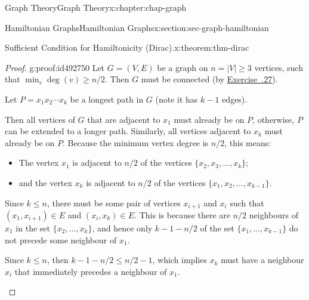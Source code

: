 \documentclass[oneside,10pt,]{book}
\newcommand{\xreffont}{\relax}
\numberwithin{equation}{section}
\begin{document}
\begin{chapterptx}{Graph Theory}{}{Graph Theory}{}{}{x:chapter:chap-graph}
\begin{sectionptx}{Hamiltonian Graphs}{}{Hamiltonian Graphs}{}{}{x:section:sec-graph-hamiltonian}
\begin{theorem}{Sufficient Condition for Hamiltonicity (Dirac).}{}{x:theorem:thm-dirac}
\end{theorem}
\begin{proof}{}{g:proof:id492750}
Let \(G = (V,E)\) be a graph on \(n = |V| \geq 3\) vertices, such that \(\min_v \deg(v) \geq n/2\). Then \(G\) must be connected (by \hyperlink{x:exercise:ex-deg-connected}{Exercise~{\xreffont 5.8.27}}).%
\par
Let \(P = x_1x_2\cdots x_k\) be a longest path in \(G\) (note it has \(k-1\) edges).%
\par
Then all vertices of \(G\) that are adjacent to \(x_1\) must already be on \(P\), otherwise, \(P\) can be extended to a longer path. Similarly, all vertices adjacent to \(x_k\) must already be on \(P\). Because the minimum vertex degree is \(n/2\), this means:%
\begin{itemize}[label=\textbullet]
\item{}The vertex \(x_1\) is adjacent to \(n/2\) of the vertices \(\{x_2,x_3,\ldots,x_k\}\);%
\item{}and the vertex \(x_k\) is adjacent to \(n/2\) of the vertices \(\{x_1,x_2,\ldots,x_{k-1}\}\).%
\end{itemize}
%
\par
Since \(k \leq n\), there must be some pair of vertices \(x_{i+1}\) and \(x_i\) such that \((x_1,x_{i+1}) \in E\) and \((x_i,x_k) \in E\). This is because there are \(n/2\) neighbours of \(x_1\) in the set \(\{x_2,\ldots,x_k\}\), and hence only \(k - 1 - n/2\) of the set \(\{x_1,\ldots,x_{k-1}\}\) do not precede some neighbour of \(x_1\).%
\par
Since \(k \leq n\), then \(k - 1 - n/2 \leq n/2-1\), which implies \(x_k\) must have a neighbour \(x_i\) that immediately precedes a neighbour of \(x_{1}\).%
\begin{sidebyside}{1}{0.2}{0.2}{0}%
\begin{sbspanel}{0.6}%
\end{sbspanel}
\end{sidebyside}
\end{proof}
\end{sectionptx}
\end{chapterptx}
\end{document}
